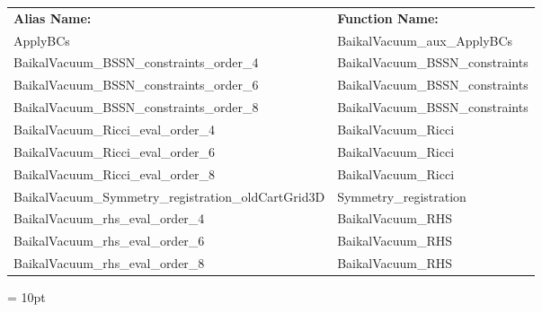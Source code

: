  \begin{tabular*}{160mm}{ll} 

{\bf Alias Name:} ~~~~~~~ & {\bf Function Name:} \\ 
ApplyBCs & BaikalVacuum\_aux\_ApplyBCs \\ 
BaikalVacuum\_BSSN\_constraints\_order\_4 & BaikalVacuum\_BSSN\_constraints \\ 
BaikalVacuum\_BSSN\_constraints\_order\_6 & BaikalVacuum\_BSSN\_constraints \\ 
BaikalVacuum\_BSSN\_constraints\_order\_8 & BaikalVacuum\_BSSN\_constraints \\ 
BaikalVacuum\_Ricci\_eval\_order\_4 & BaikalVacuum\_Ricci \\ 
BaikalVacuum\_Ricci\_eval\_order\_6 & BaikalVacuum\_Ricci \\ 
BaikalVacuum\_Ricci\_eval\_order\_8 & BaikalVacuum\_Ricci \\ 
BaikalVacuum\_Symmetry\_registration\_oldCartGrid3D & Symmetry\_registration \\ 
BaikalVacuum\_rhs\_eval\_order\_4 & BaikalVacuum\_RHS \\ 
BaikalVacuum\_rhs\_eval\_order\_6 & BaikalVacuum\_RHS \\ 
BaikalVacuum\_rhs\_eval\_order\_8 & BaikalVacuum\_RHS \\ 
\end{tabular*} 



\vspace{5mm}\parskip = 10pt 
